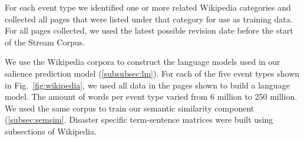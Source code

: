 
For each event type we identified one or more related Wikipedia
categories and collected all pages that were listed under that category for use
as training data.
For all pages collected, we used the latest possible revision date before the
start of the Stream Corpus. 

We use the  Wikipedia corpora to construct the language models used
in our salience prediction model (\cref{subsubsec:lm}). For each of the five
event types shown in Fig.~\ref{fig:wikipedia}, we used all data in the pages
shown to build a language model. The amount of words per event type varied from
6 million to 250 million.
We used the same corpus to train our semantic similarity component
(\cref{subsec:semsim}. 
Disaster specific term-sentence matrices were built using subsections of
Wikipedia.
